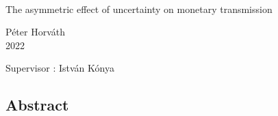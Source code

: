 \documentclass[12pt,a4paper]{article}
\begin{document}
	\\
	
	\vspace{35mm}
	
	\begin{center}
		{\huge The asymmetric effect of uncertainty on monetary transmission}\\
	\end{center}
	
	\vspace{90mm}
	
	\begin{flushright}
		{\Large Péter Horváth}\\
		{\Large 2022}
	\end{flushright}
	
	\vspace{10mm}
	\begin{center}
		{\Large Supervisor : István Kónya}
	\end{center}
	
	\thispagestyle{empty}
	
	\pagebreak
	\setcounter{tocdepth}{2}
	
	\pagebreak
	\begin{center} \section*{Abstract} \end{center}
	
\end{document}
